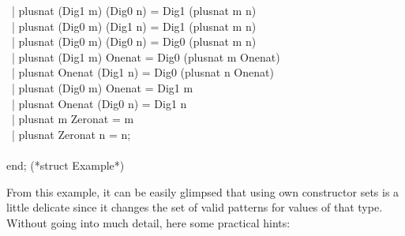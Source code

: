\begin{isabellebody}
\begin{isamarkuptext}
\hspace*{0pt} ~| plus{}nat (Dig1 m) (Dig0 n) = Dig1 (plus{}nat m n)\\
\hspace*{0pt} ~| plus{}nat (Dig0 m) (Dig1 n) = Dig1 (plus{}nat m n)\\
\hspace*{0pt} ~| plus{}nat (Dig0 m) (Dig0 n) = Dig0 (plus{}nat m n)\\
\hspace*{0pt} ~| plus{}nat (Dig1 m) One{}nat = Dig0 (plus{}nat m One{}nat)\\
\hspace*{0pt} ~| plus{}nat One{}nat (Dig1 n) = Dig0 (plus{}nat n One{}nat)\\
\hspace*{0pt} ~| plus{}nat (Dig0 m) One{}nat = Dig1 m\\
\hspace*{0pt} ~| plus{}nat One{}nat (Dig0 n) = Dig1 n\\
\hspace*{0pt} ~| plus{}nat m Zero{}nat = m\\
\hspace*{0pt} ~| plus{}nat Zero{}nat n = n;\\
\hspace*{0pt}\\
\hspace*{0pt}end; (*struct Example*)%
\end{isamarkuptext}%
\isamarkuptrue%
%
\endisatagquote
{\isafoldquote}%
%
\isadelimquote
%
\endisadelimquote
%
\begin{isamarkuptext}%
\noindent From this example, it can be easily glimpsed that using own constructor sets
  is a little delicate since it changes the set of valid patterns for values
  of that type.  Without going into much detail, here some practical hints:


\end{isamarkuptext}
\end{isabellebody}
